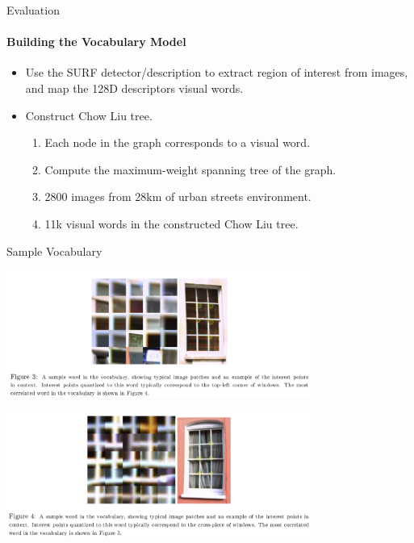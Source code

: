 \documentclass[dvipsnames, handout]{beamer}
\newcommand{\1}{\mathds{1}}	%
\begin{document}
\begin{frame}[t]{Evaluation}
\framesubtitle{Building the Vocabulary Model}
\begin{itemize}
\item Use the SURF detector/description to extract region of interest from images, and map the 128D descriptors  visual words.
\item Construct Chow Liu tree.
\begin{enumerate}
\item Each node in the graph corresponds to a visual word.
\item Compute the maximum-weight spanning tree of the graph.
\item 2800 images from 28km of urban streets environment.
\item 11k visual words in the constructed Chow Liu tree.
\end{enumerate}
\end{itemize}

\end{frame}

\begin{frame}[t]{Sample Vocabulary }
\begin{center}
\includegraphics[width=0.75\textwidth]{imgs/fig3.png}
\end{center}
\begin{center}
\includegraphics[width=0.75\textwidth]{imgs/fig4.png}
\end{center}
\end{frame}
\end{document}
